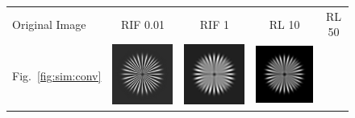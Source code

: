 \documentclass{./packages/optica-article}
\begin{document}
\begin{figure}[hbp]
	\centering
	\begin{tabular}[t]{l c c c c}
		Original Image                                                                  & RIF 0.01 & RIF 1 & RL 10 & RL 50 \\
		Fig.~\ref{fig:sim:conv}                                                         &
		\includegraphics[scale=0.25]{Simulation deconvolution/ref_conv/RIF_0.01.png}    &
		\includegraphics[scale=0.25]{Simulation deconvolution/ref_conv/RIF_1.png}       &
		\includegraphics[scale=0.25]{Simulation deconvolution/ref_conv/RL_10.png}       &

\end{tabular}
\end{figure}
\end{document}
